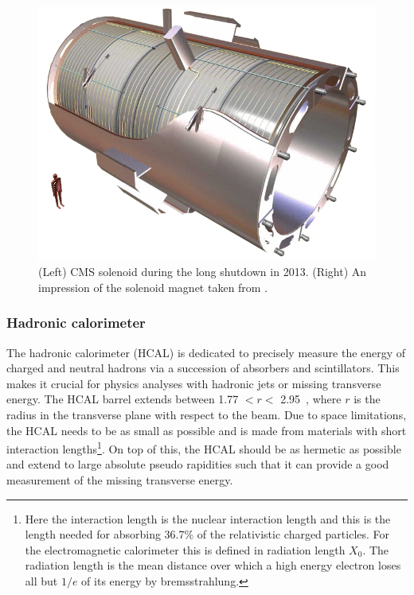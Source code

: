 \begin{figure}[htbp]
\begin{minipage}{0.39\textwidth}
		\includegraphics[width=\textwidth]{2_ExperimentalSetup/Figures/CMS-solenoid-magneta}
	\end{minipage}
		\caption{(Left) CMS solenoid during the long shutdown in 2013. (Right) An impression of the solenoid magnet taken from \cite{solenoid}.}
	
		\label{fig:CMSsolenoid}
	\end{figure}	
	
\subsubsection{Hadronic calorimeter}
\label{sec:HCAL}
The hadronic calorimeter (HCAL) is dedicated to precisely measure the energy of charged and neutral hadrons via a succession of absorbers and scintillators. This makes it crucial for physics analyses with hadronic jets or missing transverse energy. The HCAL barrel extends between 1.77 $<r<$ 2.95~\meter, where $r$ is the radius in the transverse plane with respect to the beam. Due to space limitations, the HCAL needs to be as small as possible and is made from materials with short interaction lengths\footnote{Here the interaction length is the nuclear interaction length and this is the length needed for absorbing 36.7\% of the relativistic charged particles. For the electromagnetic calorimeter this is defined in radiation length $X_0$. The radiation length is the mean distance over which a high energy electron loses all but $1/e$ of its energy by bremsstrahlung.}. 
On top of this, the HCAL should be as hermetic as possible and extend to large absolute pseudo rapidities such that it can provide a good measurement of the missing transverse energy. 


